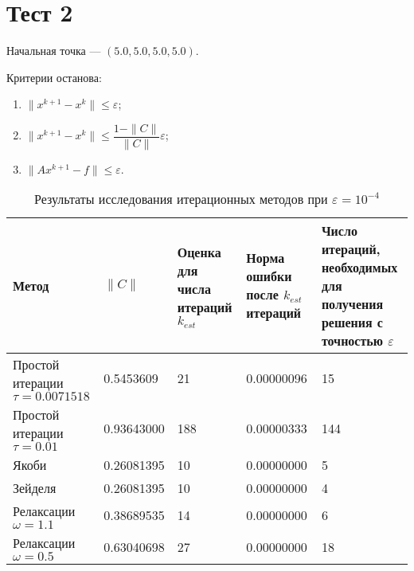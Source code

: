 \documentclass[12pt, a4paper]{article}
\begin{document}
		\section{Тест 2}
			Начальная точка --- $(5.0, 5.0, 5.0, 5.0)$.
		
	Критерии останова:
	\begin{enumerate}
		\item $\|x^{k+1} - x^k\| \le \varepsilon$;
		\medskip
		\item $\|x^{k+1} - x^k\| \le \dfrac{1-\|C\|}{\|C\|} \varepsilon$;
		\medskip
		\item $\|A x^{k+1} - f\| \le \varepsilon.$
	\end{enumerate}
	\begin{table}[h]
		\caption{Результаты исследования итерационных методов при $\varepsilon=10^{-4}$}
		\footnotesize
		\begin{tabular}{|p{4.3cm}|p{2.4cm}|p{1.9cm}|p{3cm}|p{3.15cm}|}
			\hline
			Метод & $\|C\|$& Оценка для  числа итераций $k_{est}$& Норма ошибки после $k_{est}$ итераций & Число итераций, необходимых для получения решения с точностью $\varepsilon$  \\
			\hline
			Простой итерации $\tau=0.0071518$ &0.5453609&21&0.00000096&15\\
			\hline
			Простой итерации $\tau= 0.01$ &0.93643000 &188&0.00000333&144\\
			\hline
			Якоби &0.26081395&10&0.00000000&5\\
			\hline
			Зейделя &0.26081395&10&0.00000000&4\\
			\hline
			Релаксации $\omega=1.1$ & 0.38689535&14&0.00000000&6\\
			\hline
			Релаксации $\omega=0.5$ &0.63040698&27&0.00000000&18\\
			\hline
		\end{tabular}
	\end{table}
	
\end{document}
